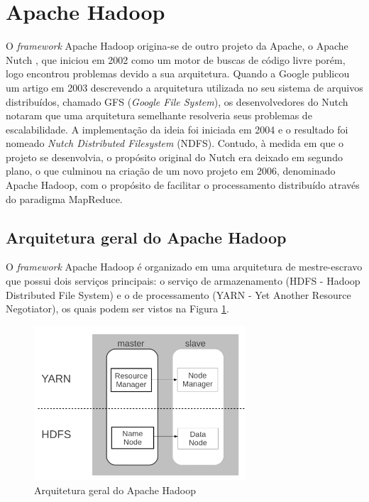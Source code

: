 \section{Apache Hadoop}
O \textit{framework} Apache Hadoop origina-se de outro projeto da Apache, o Apache Nutch \cite{Nutch}, que iniciou em 2002 como um motor de buscas de código livre porém, logo encontrou problemas devido a sua arquitetura. Quando a Google publicou um artigo em 2003 descrevendo a arquitetura utilizada no seu sistema de arquivos distribuídos, chamado GFS (\textit{Google File System}), os desenvolvedores do Nutch notaram que uma arquitetura semelhante resolveria seus problemas de escalabilidade. A implementação da ideia foi iniciada em 2004 e o resultado foi nomeado \textit{Nutch Distributed Filesystem} (NDFS). Contudo, à medida em que o projeto se desenvolvia, o propósito original do Nutch era deixado em segundo plano, o que culminou na criação de um novo projeto em 2006, denominado Apache Hadoop, com o propósito de facilitar o processamento distribuído através do paradigma MapReduce.

\subsection{Arquitetura geral do Apache Hadoop}
O \textit{framework} Apache Hadoop é organizado em uma arquitetura de mestre-escravo que possui dois serviços principais: o serviço de armazenamento (HDFS - Hadoop Distributed File System) e o de processamento (YARN - Yet Another Resource Negotiator), os quais podem ser vistos na Figura \ref{fig:ArquiteturaHadoop}.

\begin{figure}[!ht]
\centering
\includegraphics[width=0.7\textwidth]{figuras/Figura08-HadoooArchGeral.png}
\caption{Arquitetura geral do Apache Hadoop}
\label{fig:ArquiteturaHadoop}
\end{figure}

